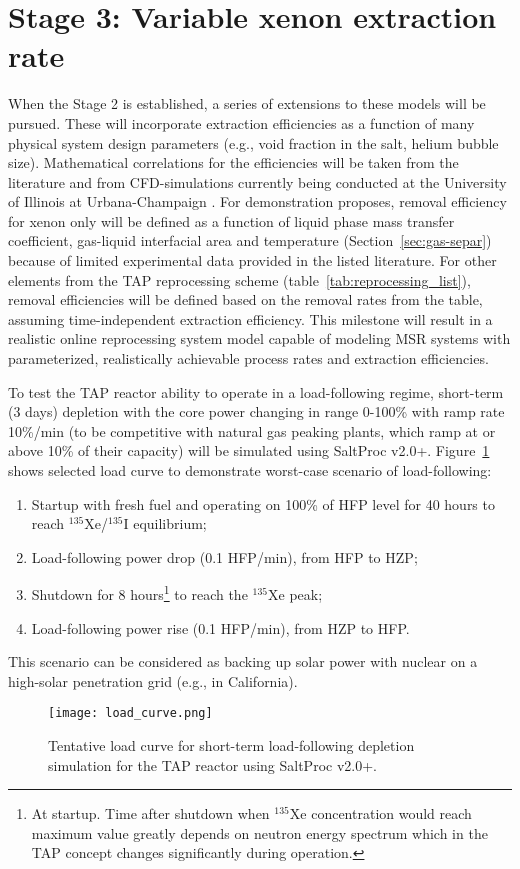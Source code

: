 \section{Stage 3: Variable xenon extraction rate}
When the Stage 2 is established, a series of extensions to these models will 
be pursued. These will incorporate extraction efficiencies as a function of 
many physical system design parameters (e.g., void fraction in the salt, 
helium bubble size). Mathematical correlations for the efficiencies will be 
taken from the literature \cite{peebles_removal_1968, 
gabbard_development_1974} and from CFD-simulations currently being conducted 
at the University of Illinois at Urbana-Champaign \cite{huff_enabling_2018}. 
For demonstration proposes, removal efficiency for xenon only will be defined 
as a function of liquid phase mass transfer coefficient, gas-liquid 
interfacial area and temperature (Section~\ref{sec:gas-separ}) because of 
limited experimental data provided in the listed literature. For other 
elements from the \gls{TAP} reprocessing scheme 
(table~\ref{tab:reprocessing_list}), removal efficiencies will be defined 
based on the removal rates from the table, assuming time-independent 
extraction efficiency. This milestone will result in a realistic online 
reprocessing system model capable of modeling \gls{MSR} systems with 
parameterized, realistically achievable process rates and extraction  
efficiencies.

To test the \gls{TAP} reactor ability to operate in a load-following 
regime, short-term (3 days) depletion with the core power changing in range 
0-100\% with ramp rate 10\%/min (to be competitive with natural gas peaking 
plants, which ramp at or above 10\% of their capacity) will be simulated using 
SaltProc v2.0+. Figure~\ref{fig:load} shows selected load curve to demonstrate 
worst-case scenario of load-following:
\begin{enumerate}
	\item Startup with fresh fuel and operating on 100\% of \gls{HFP}
level 
	for 40 hours to reach $^{135}$Xe/$^{135}$I equilibrium;
	\item Load-following power drop (0.1 \gls{HFP}/min), from \gls{HFP} 
	to \gls{HZP};
	\item Shutdown for 8 hours\footnote{At startup. Time after shutdown when 
	$^{135}$Xe concentration would reach maximum value greatly depends on 
	neutron energy spectrum which in the \gls{TAP} concept changes 
	significantly during operation.} to reach the $^{135}$Xe peak;
	\item Load-following power rise (0.1 \gls{HFP}/min), from \gls{HZP} 
	to \gls{HFP}.
\end{enumerate}
This scenario can be considered as backing up solar power with
nuclear on a 
high-solar penetration grid (e.g., in California).
\begin{figure}[bth!] %
	\centering
	\texttt{[image: load\_curve.png]}
	\caption{Tentative load curve for short-term load-following depletion 
	simulation for the \gls{TAP} reactor using SaltProc v2.0+.}
	\label{fig:load}
\end{figure}

